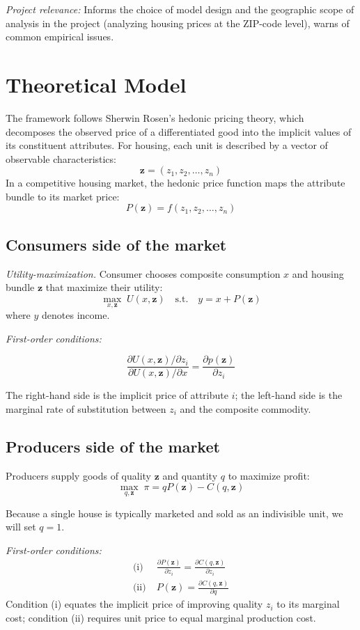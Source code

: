 \documentclass[11pt]{article}
\begin{document}
\textit{Project relevance:} Informs the choice of model design and the geographic scope of analysis in the project (analyzing housing prices at the ZIP-code level), warns of common empirical issues.


\section{Theoretical Model}

The framework follows Sherwin Rosen’s hedonic pricing theory, which decomposes the observed price of a differentiated good into the implicit values of its constituent attributes.  
For housing, each unit is described by a vector of observable characteristics:  
\[
\mathbf z=(z_{1},z_{2},\ldots,z_{n})
\]
In a competitive housing market, the hedonic price function maps the attribute bundle to its market price:
\[
P(\mathbf z)=f(z_{1},z_{2},\ldots,z_{n})
\]

\subsection{Consumers side of the market}

\textit{Utility-maximization.}  
Consumer chooses composite consumption $x$ and housing bundle $\mathbf z$ that maximize their utility:  
\[
\max_{x,\mathbf z}\;U(x,\mathbf z)
\quad\text{s.t.}\quad
y=x+P(\mathbf z)
\]
where $y$ denotes income.

\textit{First-order conditions:}  

\[ \frac{\partial U(x,\mathbf z) / \partial z_i}{\partial U (x,\mathbf z)/ \partial x} =  
\frac{\partial p(\mathbf{z})}{\partial z_i} \]

The right-hand side is the implicit price of attribute $i$; the left-hand side is the marginal rate of substitution between $z_{i}$ and the composite commodity.

\subsection{Producers side of the market}

Producers supply goods of quality $\mathbf z$ and quantity $q$ to maximize profit:
\[
\max_{q,\mathbf z}\;\pi=qP(\mathbf z)-C(q,\mathbf z)
\]

Because a single house is typically marketed and sold as an indivisible unit, we will set $q=1$.

\textit{First-order conditions:}
\begin{align*}
\text{(i)}\;&\frac{\partial P(\mathbf z)}{\partial z_{i}}= \frac{\partial C(q,\mathbf z)}{\partial z_{i}}
\\[4pt]
\text{(ii)}\;&P(\mathbf z)=\frac{\partial C(q,\mathbf z)}{\partial q}
\end{align*}
Condition (i) equates the implicit price of improving quality $z_{i}$ to its marginal cost; condition (ii) requires unit price to equal marginal production cost.
\end{document}
